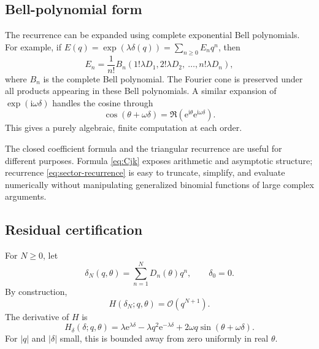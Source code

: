 \documentclass[11pt,oneside]{article}
\numberwithin{equation}{section}
\theoremstyle{plain}
\theoremstyle{definition}
\theoremstyle{remark}
\newcommand{\e}{\mathrm e}
\newcommand{\ii}{\mathrm i}
\newcommand{\Ord}{\mathcal O}
\begin{document}
\subsection{Bell-polynomial form}

The recurrence can be expanded using complete exponential Bell polynomials.
For example, if
\(
 E(q)=\exp(\lambda\delta(q))=\sum_{n\ge0}E_nq^n
\), then
\begin{equation}\label{eq:Bell-exp}
 E_n=\frac1{n!}
 B_n\!\left(1!\lambda D_1,2!\lambda D_2,\
 \ldots,n!\lambda D_n\right),
\end{equation}
where \(B_n\) is the complete Bell polynomial.  The Fourier cone is
preserved under all products appearing in these Bell polynomials.  A similar
expansion of
\(
 \exp(\ii\omega\delta)
\)
handles the cosine through
\[
 \cos(\theta+\omega\delta)
 =\Re\!\left(\e^{\ii\theta}\e^{\ii\omega\delta}\right).
\]
This gives a purely algebraic, finite computation at each order.

The closed coefficient formula and the triangular recurrence are useful for
different purposes.  Formula \cref{eq:Cjk} exposes arithmetic and asymptotic
structure; recurrence \cref{eq:sector-recurrence} is easy to truncate,
simplify, and evaluate numerically without manipulating generalized
binomial functions of large complex arguments.

\subsection{Residual certification}

For \(N\ge0\), let
\begin{equation}\label{eq:delta-N}
 \delta_N(q,\theta)=\sum_{n=1}^ND_n(\theta)q^n,
 \qquad \delta_0=0.
\end{equation}
By construction,
\begin{equation}\label{eq:residual-order}
 H(\delta_N;q,\theta)=\Ord(q^{N+1}).
\end{equation}
The derivative of \(H\) is
\begin{equation}\label{eq:H-delta}
 H_\delta(\delta;q,\theta)=
 \lambda\e^{\lambda\delta}
 -\lambda q^2\e^{-\lambda\delta}
 +2\omega q\sin(\theta+\omega\delta).
\end{equation}
For \(|q|\) and \(|\delta|\) small, this is bounded away from zero
uniformly in real \(\theta\).
\end{document}
